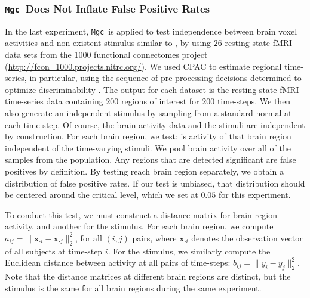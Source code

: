 \documentclass[11pt]{article}
\newcommand{\note}[2][]{\added[#1,remark={#2}]{}}
\providecommand{\sct}[1]{{\sc \texttt{#1}}}
\providecommand{\mb}[1]{\boldsymbol{#1}}
\newcommand{\Migraine}{\sct{Migraine}}
\newcommand{\mtg}{\sct{m2g}}
\newcommand{\Mgc}{\sct{Mgc}}
\newcommand{\cs}[1]{{\note{cs: #1}}}
\newcommand{\mbx}{\ensuremath{\mb{x}}}
\begin{document}

\subsubsection*{\Mgc~Does Not Inflate False Positive Rates} %

In the last experiment, \Mgc~is applied to test independence between brain voxel activities and non-existent stimulus similar to \cite{EklundKnutsson2012}, by using $26$ resting state fMRI data sets from the 1000 functional connectomes project (\url{http://fcon_1000.projects.nitrc.org/}). We used CPAC \cite{CPAC2015} to estimate regional time-series, in particular, using the sequence of pre-processing decisions determined to optimize discriminability \cite{Wang2016}.  The output for each dataset is the resting state fMRI time-series data containing $200$ regions of interest for $200$ time-steps.
We then also generate  an independent stimulus  by sampling from a standard normal at each time step.  Of course, the brain activity data and the stimuli are independent by construction.
For each brain region, we test: is activity of that  brain region independent of the time-varying stimuli. We pool brain activity over all of the samples from the population.
Any regions that are detected significant are false positives by definition.  By testing reach brain region separately, we obtain a distribution of false positive rates.  If our test is unbiased, that distribution should be centered around the critical level, which we set at $0.05$ for this experiment.


To conduct this test, we must construct a distance matrix for brain region activity, and another for the stimulus. For each brain region, we compute $a_{ij}=\|\mbx_{\cdot i}-\mbx_{\cdot j}\|_2^2$, for all $(i,j)$ pairs,  where $\mbx_{\cdot i}$ denotes the observation vector of all subjects at time-step $i$.
For the stimulus, we similarly compute the Euclidean distance between activity at all pairs of time-steps: $b_{ij}= \|y_i - y_j \|_2^2$.
\cs{i added subsecripts and superscripts, was i right?}
Note that the distance matrices at different brain regions are distinct, but the stimulus is the same for all brain regions during the same experiment.
\end{document}
